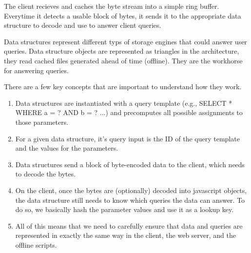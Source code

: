 The client recieves and caches the byte stream into a simple ring buffer. Everytime it detects a usable block of bytes, it sends it to the appropriate data structure to decode and use to answer client queries.


Data structures represent different typs of storage engines that could answer user queries. Data structure objects are represented as triangles in the architecture, they read cached files generated ahead of time (offline). They are the workhorse for answering queries.

There are a few key concepts that are important to understand how they work.

\begin{enumerate}
\item Data structures are instantiated with a query template (e.g., SELECT * WHERE a = ? AND b = ? ...) and precomputes all possible assignments to those parameters.
\item For a given data structure, it's query input is the ID of the query template and the values for the parameters.
\item Data structures send a block of byte-encoded data to the client, which needs to decode the bytes.
\item On the client, once the bytes are (optionally) decoded into javascript objects, the data structure still needs to know which queries the data can answer. To do so, we basically hash the parameter values and use it as a lookup key.
\item All of this means that we need to carefully ensure that data and queries are represented in exactly the same way in the client, the web server, and the offline scripts.
\end{enumerate}
